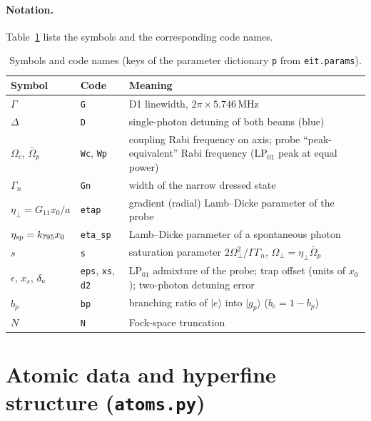 \documentclass[11pt,a4paper]{article}
\newcommand{\ket}[1]{|#1\rangle}
\newcommand{\gp}{\ket{g_p}}
\newcommand{\Om}{\Omega}
\newcommand{\etap}{\eta_\perp}
\newcommand{\code}[1]{\texttt{#1}}
\begin{document}
\paragraph{Notation.} Table~\ref{tab:notation} lists the symbols and the corresponding code names.

\begin{table}[h]
\centering\small
\caption{Symbols and code names (keys of the parameter dictionary \code{p} from \code{eit.params}).}
\label{tab:notation}
\begin{tabularx}{\textwidth}{@{}llX@{}}
\toprule
Symbol & Code & Meaning\\
\midrule
$\Gamma$ & \code{G} & D1 linewidth, $2\pi\times5.746$\,MHz\\
$\Delta$ & \code{D} & single-photon detuning of both beams (blue)\\
$\Om_c$, $\bar\Om_p$ & \code{Wc}, \code{Wp} & coupling Rabi frequency on axis; probe ``peak-equivalent'' Rabi frequency (LP$_{01}$ peak at equal power)\\
$\Gamma_n$ & \code{Gn} & width of the narrow dressed state\\
$\etap=G_{11}x_0/a$ & \code{etap} & gradient (radial) Lamb--Dicke parameter of the probe\\
$\eta_{\rm sp}=k_{795}x_0$ & \code{eta\_sp} & Lamb--Dicke parameter of a spontaneous photon\\
$s$ & \code{s} & saturation parameter $2\Om_\perp^2/\Gamma\Gamma_n$, $\Om_\perp=\etap\bar\Om_p$\\
$\epsilon$, $x_s$, $\delta_{\rm e}$ & \code{eps}, \code{xs}, \code{d2} & LP$_{01}$ admixture of the probe; trap offset (units of $x_0$); two-photon detuning error\\
$b_p$ & \code{bp} & branching ratio of $\ket e$ into $\gp$ ($b_c=1-b_p$)\\
$N$ & \code{N} & Fock-space truncation\\
\bottomrule
\end{tabularx}
\end{table}

\section{Atomic data and hyperfine structure (\code{atoms.py})}
\label{sec:atoms}
\end{document}
